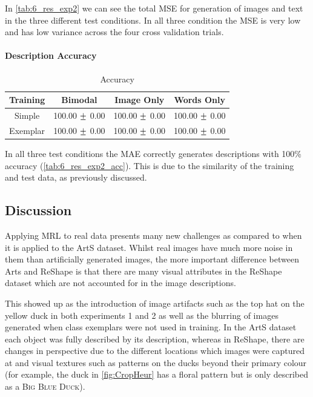 In \autoref{tab:6_res_exp2} we can see the total \ac{MSE} for generation of images and text in the three different test conditions. In all three condition the \ac{MSE} is very low and has low variance across the four cross validation trials.

\paragraph{Description Accuracy}
\begin{table}[h!]
\centering
	\begin{tabular}{|c|c|c|c|}
	\hline
\textbf{Training}	 & 	\textbf{Bimodal} & \textbf{Image Only} 	& 	\textbf{Words Only} \\ \hline
Simple &  100.00 $\mypm$ 0.00 & 100.00 $\mypm$ 0.00 & 100.00 $\mypm$ 0.00 \\ \hline
Exemplar & 100.00 $\mypm$ 0.00 & 100.00 $\mypm$ 0.00 & 100.00 $\mypm$ 0.00 \\ \hline
\end{tabular}
\caption{Accuracy}
\label{tab:6_res_exp2_acc}
\end{table}


In all three test conditions the \ac{MAE} correctly generates descriptions with 100\% accuracy (\autoref{tab:6_res_exp2_acc}). This is due to the similarity of the training and test data, as previously discussed.

\subsection{Discussion}

Applying \ac{MRL} to real data presents many new challenges as compared to when it is applied to the ArtS dataset. Whilst real images have much more noise in them than artificially generated images, the more important difference between Arts and ReShape is that there are many visual attributes in the ReShape dataset which are not accounted for in the image descriptions.

This showed up as the introduction of image artifacts such as the top hat on the yellow duck in both experiments 1 and 2 as well as the blurring of images generated when class exemplars were not used in training. In the ArtS dataset each object was fully described by its description, whereas in ReShape, there are changes in perspective due to the different locations which images were captured at and visual textures such as patterns on the ducks beyond their primary colour (for example, the duck in \autoref{fig:CropHeur} has a floral pattern but is only described as a \textsc{Big Blue Duck}).

